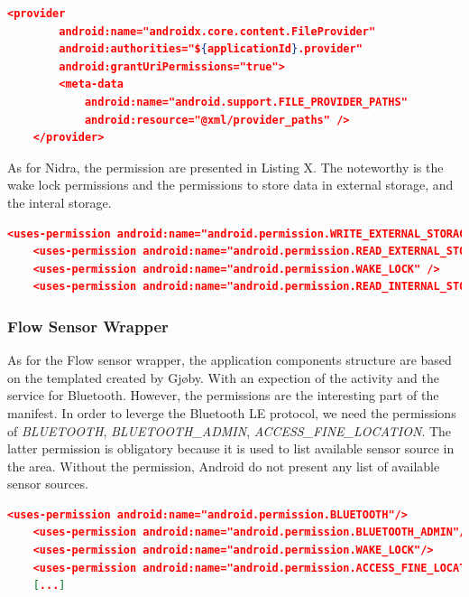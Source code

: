 \begin{lstlisting}[language=json, caption={My Caption}, captionpos=b]
    <provider
        android:name="androidx.core.content.FileProvider"
        android:authorities="${applicationId}.provider"
        android:grantUriPermissions="true">
        <meta-data
            android:name="android.support.FILE_PROVIDER_PATHS"
            android:resource="@xml/provider_paths" />
    </provider>
\end{lstlisting}

As for Nidra, the permission are presented in Listing X. The noteworthy is the wake lock permissions and the permissions to store data in external storage, and the interal storage. 

\begin{lstlisting}[language=json, caption={My Caption}, captionpos=b]
    <uses-permission android:name="android.permission.WRITE_EXTERNAL_STORAGE" />
    <uses-permission android:name="android.permission.READ_EXTERNAL_STORAGE" />
    <uses-permission android:name="android.permission.WAKE_LOCK" />
    <uses-permission android:name="android.permission.READ_INTERNAL_STORAGE" />
\end{lstlisting}

\subsubsection{Flow Sensor Wrapper}

As for the Flow sensor wrapper, the application components structure are based on the templated created by Gjøby. With an expection of the activity and the service for Bluetooth. However, the permissions are the interesting part of the manifest. In order to leverge the Bluetooth LE protocol, we need the permissions of \textit{BLUETOOTH}, \textit{BLUETOOTH\_ADMIN}, \textit{ACCESS\_FINE\_LOCATION}. The latter permission is obligatory because it is used to list available sensor source in the area. Without the permission, Android do not present any list of available sensor sources. 

\begin{lstlisting}[language=json, caption={My Caption}, captionpos=b]
    <uses-permission android:name="android.permission.BLUETOOTH"/>
    <uses-permission android:name="android.permission.BLUETOOTH_ADMIN"/>
    <uses-permission android:name="android.permission.WAKE_LOCK"/>
    <uses-permission android:name="android.permission.ACCESS_FINE_LOCATION"/>
    [...]
\end{lstlisting}



